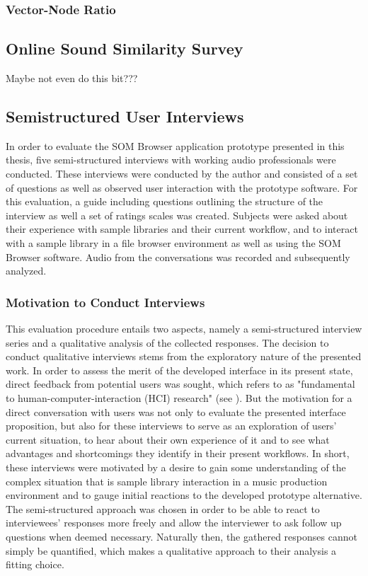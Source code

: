 \subsubsection{Vector-Node Ratio}
\label{subsubsec:vector_node_ratio}

\subsection{Online Sound Similarity Survey}
\label{subsec:evaluation_survey}
Maybe not even do this bit???

\subsection{Semistructured User Interviews}
\label{subsec:evaluation_interviews}

In order to evaluate the SOM Browser application prototype presented in this
thesis, five semi-structured interviews with working audio professionals were
conducted. These interviews were conducted by the author and consisted of a set
of questions as well as observed user interaction with the prototype software.
For this evaluation, a guide including questions outlining the
structure of the interview as well a set of ratings scales was created. Subjects
were asked about their experience with sample libraries and their current
workflow, and to interact with a sample library in a file browser environment as
well as using the SOM Browser software. Audio from the conversations was
recorded and subsequently analyzed.

\subsubsection{Motivation to Conduct Interviews}
\label{subsubsec:interview_motivation}

This evaluation procedure entails two aspects, namely a semi-structured
interview series and a qualitative analysis of the collected responses. The
decision to conduct qualitative interviews stems from the exploratory nature of
the presented work. In order to assess the merit of the developed interface in
its present state, direct feedback from potential users was sought, which
\citet{lazar2017} refers to as "fundamental to human-computer-interaction (HCI)
research" (see \citet[p.187]{lazar2017}). But the motivation for a direct
conversation with users was not only to evaluate the presented interface
proposition, but also for these interviews to serve as an exploration of users'
current situation, to hear about their own experience of it and to see what
advantages and shortcomings they identify in their present workflows. In short,
these interviews were motivated by a desire to gain some understanding of the
complex situation that is sample library interaction in a music production
environment and to gauge initial reactions to the developed prototype
alternative. The semi-structured approach was chosen in order to be able to
react to interviewees' responses more freely and allow the interviewer to ask
follow up questions when deemed necessary. Naturally then, the gathered
responses cannot simply be quantified, which makes a qualitative approach to
their analysis a fitting choice.

